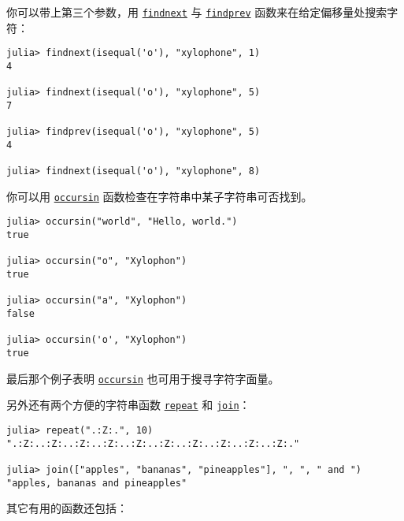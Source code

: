 你可以带上第三个参数，用 \hyperlink{9906000186778518011}{\texttt{findnext}} 与 \hyperlink{3864667477361062614}{\texttt{findprev}} 函数来在给定偏移量处搜索字符：




\begin{verbatim}
julia> findnext(isequal('o'), "xylophone", 1)
4

julia> findnext(isequal('o'), "xylophone", 5)
7

julia> findprev(isequal('o'), "xylophone", 5)
4

julia> findnext(isequal('o'), "xylophone", 8)
\end{verbatim}



你可以用 \hyperlink{7988132114328914630}{\texttt{occursin}} 函数检查在字符串中某子字符串可否找到。




\begin{verbatim}
julia> occursin("world", "Hello, world.")
true

julia> occursin("o", "Xylophon")
true

julia> occursin("a", "Xylophon")
false

julia> occursin('o', "Xylophon")
true
\end{verbatim}



最后那个例子表明 \hyperlink{7988132114328914630}{\texttt{occursin}} 也可用于搜寻字符字面量。



另外还有两个方便的字符串函数 \hyperlink{15426606278434194584}{\texttt{repeat}} 和 \hyperlink{18064910688022011979}{\texttt{join}}：




\begin{verbatim}
julia> repeat(".:Z:.", 10)
".:Z:..:Z:..:Z:..:Z:..:Z:..:Z:..:Z:..:Z:..:Z:..:Z:."

julia> join(["apples", "bananas", "pineapples"], ", ", " and ")
"apples, bananas and pineapples"
\end{verbatim}



其它有用的函数还包括：



